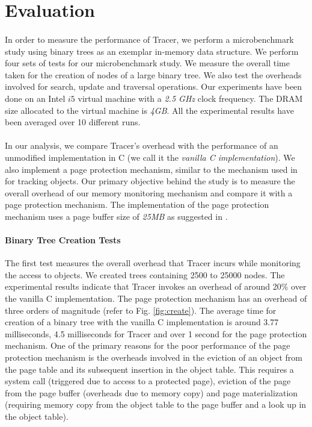 \section{Evaluation}
\label{sec:eval}
\paragraph{}
In order to measure the performance of Tracer, we perform a microbenchmark study using binary trees as an exemplar in-memory data structure. We perform four sets of tests for our microbenchmark study. We measure the overall time taken for the creation of nodes of a large binary tree. We also test the overheads involved for search, update and traversal operations. Our experiments have been done on an Intel $i5$ virtual machine with a {\emph{2.5 GHz}} clock frequency. The DRAM size allocated to the virtual machine is {\emph{4GB}}. All the experimental results have been averaged over 10 different runs. 

\paragraph{}
In our analysis, we compare Tracer's overhead with the performance of an unmodified implementation in C (we call it the {\emph{vanilla C implementation}}). We also implement a page protection mechanism, similar to the mechanism used in \cite{SSDAlloc} for tracking objects. Our primary objective behind the study is to measure the overall overhead of our memory monitoring mechanism and compare it with a page protection mechanism. The implementation of the page protection mechanism uses a page buffer size of {\emph{25MB}} as suggested in \cite{SSDAlloc}.

\paragraph{Binary Tree Creation Tests}
The first test measures the overall overhead that Tracer incurs while monitoring the access to objects. We created trees containing 2500 to 25000 nodes. The experimental results indicate that Tracer invokes an overhead of around 20\% over the vanilla C implementation. The page protection mechanism has an overhead of three orders of magnitude (refer to Fig. \ref{fig:create}). The average time for creation of a binary tree with the vanilla C implementation is around 3.77 milliseconds, 4.5 milliseconds for Tracer and over 1 second for the page protection mechanism. One of the primary reasons for the poor performance of the page protection mechanism is the overheads involved in the eviction of an object from the page table and its subsequent insertion in the object table. This requires a system call (triggered due to access to a protected page), eviction of the page from the page buffer (overheads due to memory copy) and page materialization (requiring memory copy from the object table to the page buffer and a look up in the object table). 

